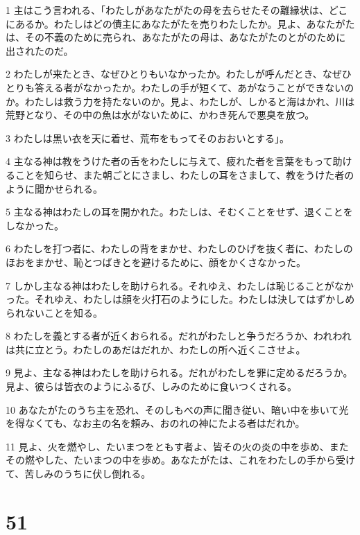 \par 1 主はこう言われる、「わたしがあなたがたの母を去らせたその離縁状は、どこにあるか。わたしはどの債主にあなたがたを売りわたしたか。見よ、あなたがたは、その不義のために売られ、あなたがたの母は、あなたがたのとがのために出されたのだ。
\par 2 わたしが来たとき、なぜひとりもいなかったか。わたしが呼んだとき、なぜひとりも答える者がなかったか。わたしの手が短くて、あがなうことができないのか。わたしは救う力を持たないのか。見よ、わたしが、しかると海はかれ、川は荒野となり、その中の魚は水がないために、かわき死んで悪臭を放つ。
\par 3 わたしは黒い衣を天に着せ、荒布をもってそのおおいとする」。
\par 4 主なる神は教をうけた者の舌をわたしに与えて、疲れた者を言葉をもって助けることを知らせ、また朝ごとにさまし、わたしの耳をさまして、教をうけた者のように聞かせられる。
\par 5 主なる神はわたしの耳を開かれた。わたしは、そむくことをせず、退くことをしなかった。
\par 6 わたしを打つ者に、わたしの背をまかせ、わたしのひげを抜く者に、わたしのほおをまかせ、恥とつばきとを避けるために、顔をかくさなかった。
\par 7 しかし主なる神はわたしを助けられる。それゆえ、わたしは恥じることがなかった。それゆえ、わたしは顔を火打石のようにした。わたしは決してはずかしめられないことを知る。
\par 8 わたしを義とする者が近くおられる。だれがわたしと争うだろうか、われわれは共に立とう。わたしのあだはだれか、わたしの所へ近くこさせよ。
\par 9 見よ、主なる神はわたしを助けられる。だれがわたしを罪に定めるだろうか。見よ、彼らは皆衣のようにふるび、しみのために食いつくされる。
\par 10 あなたがたのうち主を恐れ、そのしもべの声に聞き従い、暗い中を歩いて光を得なくても、なお主の名を頼み、おのれの神にたよる者はだれか。
\par 11 見よ、火を燃やし、たいまつをともす者よ、皆その火の炎の中を歩め、またその燃やした、たいまつの中を歩め。あなたがたは、これをわたしの手から受けて、苦しみのうちに伏し倒れる。

\chapter{51}

